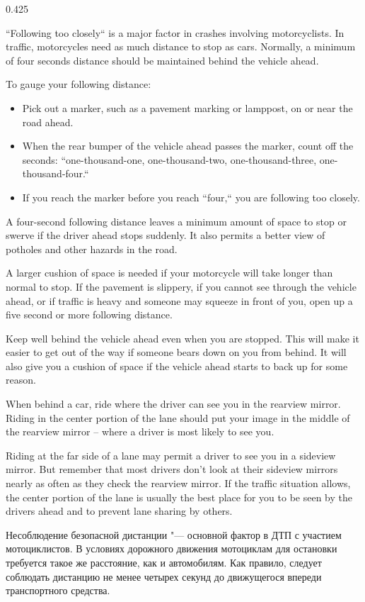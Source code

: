 \begin{langblock}{0.425}
	\begin{eng}
	``Following too closely`` is a major factor in crashes involving motorcyclists. In traffic, motorcycles need as much distance to stop as cars.  Normally, a minimum of four seconds distance should be maintained behind the vehicle ahead.
	
	To gauge your following distance:
	
	\begin{itemize}[noitemsep]
		\item Pick out a marker, such as a pavement marking or lamppost, on or near the road ahead.
		\item When the rear bumper of the vehicle ahead passes the marker, count off the seconds: ``one-thousand-one, one-thousand-two, one-thousand-three, one-thousand-four.``
		\item If you reach the marker before you reach ``four,`` you are following too closely.
	\end{itemize}
	
	
	
	
	A four-second following distance leaves a minimum amount of space to stop or swerve if the driver ahead stops suddenly. It also permits a better view of potholes and other hazards in the road.
	
	A larger cushion of space is needed if your motorcycle will take longer than normal to stop. If the pavement is slippery, if you cannot see through the vehicle ahead, or if traffic is heavy and someone may squeeze in front of you, open up a five second or more following distance.
	
	Keep well behind the vehicle ahead even when you are stopped.  This will make it easier to get out of the way if someone bears down on you from behind. It will also give you a cushion of space if the vehicle ahead starts to back up for some reason.
	
	When behind a car, ride where the driver can see you in the rearview mirror. Riding in the center portion of the lane should put your image in the middle of the rearview mirror -- where a driver is most likely to see you.
	
	Riding at the far side of a lane may permit a driver to see you in a sideview mirror. But remember that most drivers don't look at their sideview mirrors nearly as often as they check the rearview mirror. If the traffic situation allows, the center portion of the lane is usually the best place for you to be seen by the drivers ahead and to prevent lane sharing by others.
	\end{eng}
	\begin{rus}
		Несоблюдение безопасной дистанции "--- основной фактор в ДТП с участием мотоциклистов. В условиях дорожного движения мотоциклам для остановки требуется такое же расстояние, как и автомобилям. Как правило, следует соблюдать дистанцию не менее четырех секунд до движущегося впереди транспортного средства.
		

\end{rus}
\end{langblock}
